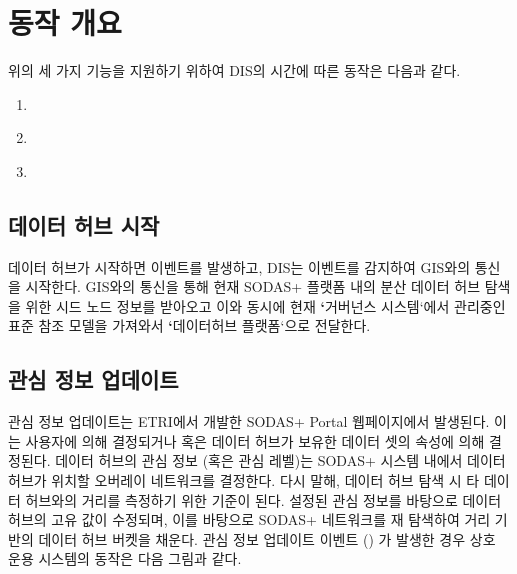 \documentclass[a4paper,10pt,english]{sphinxmanual}
\begin{document}
\section{동작 개요}
\label{\detokenize{intro:id4}}
\sphinxAtStartPar
위의 세 가지 기능을 지원하기 위하여 DIS의 시간에 따른 동작은 다음과 같다.
\begin{enumerate}
%
\item {} 
\sphinxAtStartPar
{\hyperref[\detokenize{intro:id5}]{}}

\item {} 
\sphinxAtStartPar
{\hyperref[\detokenize{intro:id10}]{}}

\item {} 
\sphinxAtStartPar
{\hyperref[\detokenize{intro:id11}]{}}

\end{enumerate}


\subsection{데이터 허브 시작}
\label{\detokenize{intro:id5}}
\sphinxAtStartPar
데이터 허브가 시작하면  이벤트를 발생하고, DIS는  이벤트를 감지하여
GIS와의 통신을 시작한다. GIS와의 통신을 통해 현재 SODAS+ 플랫폼 내의 분산 데이터 허브 탐색을 위한
시드 노드 정보를 받아오고 이와 동시에 현재 {\color{red}\bfseries{}`}거버넌스 시스템`에서 관리중인 표준 참조 모델을 가져와서
{\color{red}\bfseries{}`}데이터허브 플랫폼`으로 전달한다.


\begin{DUlineblock}{0em}
\item[] 
\end{DUlineblock}


\subsection{관심 정보 업데이트}
\label{\detokenize{intro:id10}}
\sphinxAtStartPar
관심 정보 업데이트는 ETRI에서 개발한 SODAS+ Portal 웹페이지에서 발생된다. 이는 사용자에 의해 결정되거나 혹은 데이터 허브가 보유한 데이터 셋의 속성에 의해 결정된다.
데이터 허브의 관심 정보 (혹은 관심 레벨)는 SODAS+ 시스템 내에서 데이터 허브가 위치할 오버레이 네트워크를 결정한다.
다시 말해, 데이터 허브 탐색 시 타 데이터 허브와의 거리를 측정하기 위한 기준이 된다.
설정된 관심 정보를 바탕으로 데이터 허브의 고유 값이 수정되며, 이를 바탕으로 SODAS+ 네트워크를 재 탐색하여 거리 기반의 데이터 허브 버켓을 채운다.
관심 정보 업데이트 이벤트 () 가 발생한 경우 상호 운용 시스템의 동작은 다음 그림과 같다.
\end{document}
